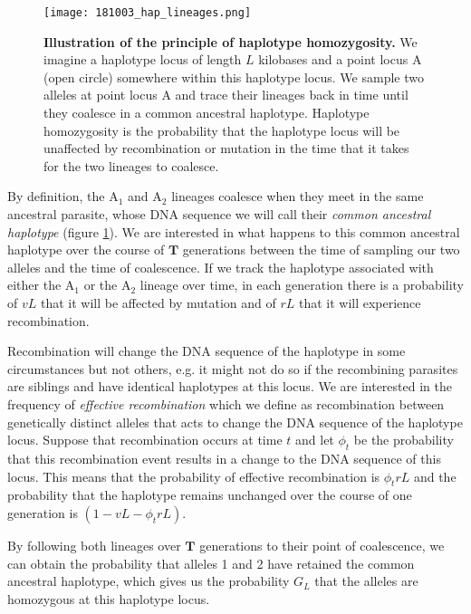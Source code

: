 \documentclass[_main.tex]{subfiles}
\begin{document}
\begin{figure}[h!]
\centering
\texttt{[image: 181003\_hap\_lineages.png]}
\caption{\textbf{Illustration of the principle of haplotype homozygosity.}  We imagine a haplotype locus of length $L$ kilobases and a point locus A (open circle) somewhere within this haplotype locus.  We sample two alleles at point locus A and trace their lineages back in time until they coalesce in a common ancestral haplotype.  Haplotype homozygosity is the probability that the haplotype locus will be unaffected by recombination or mutation in the time that it takes for the two lineages to coalesce.}
\label{fig:main_ancestral_haplotype}
\end{figure}

By definition, the $\text{A}_1$ and $\text{A}_2$ lineages coalesce when they meet in the same ancestral parasite, whose DNA sequence we will call their \textit{common ancestral haplotype} (figure \ref{fig:main_ancestral_haplotype}). We are interested in what happens to this common ancestral haplotype over the course of $\textbf{T}$ generations between the time of sampling our two alleles and the time of coalescence.  If we track the haplotype associated with either the $\text{A}_1$ or the $\text{A}_2$ lineage over time, in each generation there is a probability of $vL$ that it will be affected by mutation and of $rL$ that it will experience recombination.   

Recombination will change the DNA sequence of the haplotype in some circumstances but not others, e.g. it might not do so if the recombining parasites are siblings and have identical haplotypes at this locus.  We are interested in the frequency of \textit{effective recombination} which we define as recombination between genetically distinct alleles that acts to change the DNA sequence of the haplotype locus.  Suppose that recombination occurs at time $t$ and let $\phi_t$ be the probability that this recombination event results in a change to the DNA sequence of this locus.  This means that the probability of effective recombination is $\phi_t r L$ and the probability that the haplotype remains unchanged over the course of one generation is $ ( 1 - v L - \phi_t r L )$. 

By following both lineages over $\textbf{T}$ generations to their point of coalescence, we can obtain the probability that alleles 1 and 2 have retained the common ancestral haplotype, which gives us the probability $G_L$ that the alleles are homozygous at this haplotype locus.
\end{document}
